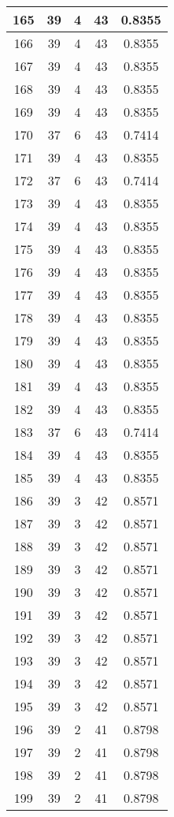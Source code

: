 \documentclass[letterpaper, 12pt]{article}
\begin{document}
\begin{longtable}{|c|c|c|c|c|}
\hline
165 & 39 & 4 & 43 & 0.8355 \\
\hline
166 & 39 & 4 & 43 & 0.8355 \\
\hline
167 & 39 & 4 & 43 & 0.8355 \\
\hline
168 & 39 & 4 & 43 & 0.8355 \\
\hline
169 & 39 & 4 & 43 & 0.8355 \\
\hline
170 & 37 & 6 & 43 & 0.7414 \\
\hline
171 & 39 & 4 & 43 & 0.8355 \\
\hline
172 & 37 & 6 & 43 & 0.7414 \\
\hline
173 & 39 & 4 & 43 & 0.8355 \\
\hline
174 & 39 & 4 & 43 & 0.8355 \\
\hline
175 & 39 & 4 & 43 & 0.8355 \\
\hline
176 & 39 & 4 & 43 & 0.8355 \\
\hline
177 & 39 & 4 & 43 & 0.8355 \\
\hline
178 & 39 & 4 & 43 & 0.8355 \\
\hline
179 & 39 & 4 & 43 & 0.8355 \\
\hline
180 & 39 & 4 & 43 & 0.8355 \\
\hline
181 & 39 & 4 & 43 & 0.8355 \\
\hline
182 & 39 & 4 & 43 & 0.8355 \\
\hline
183 & 37 & 6 & 43 & 0.7414 \\
\hline
184 & 39 & 4 & 43 & 0.8355 \\
\hline
185 & 39 & 4 & 43 & 0.8355 \\
\hline
186 & 39 & 3 & 42 & 0.8571 \\
\hline
187 & 39 & 3 & 42 & 0.8571 \\
\hline
188 & 39 & 3 & 42 & 0.8571 \\
\hline
189 & 39 & 3 & 42 & 0.8571 \\
\hline
190 & 39 & 3 & 42 & 0.8571 \\
\hline
191 & 39 & 3 & 42 & 0.8571 \\
\hline
192 & 39 & 3 & 42 & 0.8571 \\
\hline
193 & 39 & 3 & 42 & 0.8571 \\
\hline
194 & 39 & 3 & 42 & 0.8571 \\
\hline
195 & 39 & 3 & 42 & 0.8571 \\
\hline
196 & 39 & 2 & 41 & 0.8798 \\
\hline
197 & 39 & 2 & 41 & 0.8798 \\
\hline
198 & 39 & 2 & 41 & 0.8798 \\
\hline
199 & 39 & 2 & 41 & 0.8798 \\
\hline
\end{longtable}
\end{document}
